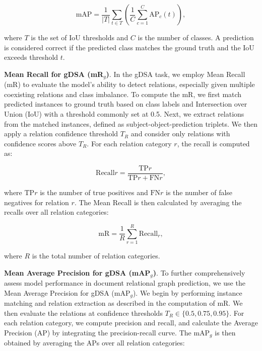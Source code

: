 \begin{equation} \text{mAP} = \frac{1}{|T|} \sum_{t \in T} \left( \frac{1}{C} \sum_{c=1}^{C} \text{AP}_{c}(t) \right), \end{equation}

where $T$ is the set of IoU thresholds and $C$ is the number of classes. A prediction is considered correct if the predicted class matches the ground truth and the IoU exceeds threshold $t$.

\noindent \textbf{Mean Recall for gDSA (mR$_g$)}. In the gDSA task, we employ Mean Recall (mR) to evaluate the model's ability to detect relations, especially given multiple coexisting relations and class imbalance. To compute the mR, we first match predicted instances to ground truth based on class labels and Intersection over Union (IoU) with a threshold commonly set at 0.5. Next, we extract relations from the matched instances, defined as subject-object-prediction triplets. We then apply a relation confidence threshold $T_{R}$ and consider only relations with confidence scores above $T_{R}$. For each relation category $r$, the recall is computed as:

\begin{equation} \text{Recall}{r} = \frac{\text{TP}{r}}{\text{TP}{r} + \text{FN}{r}}, \end{equation}

where $\text{TP}{r}$ is the number of true positives and $\text{FN}{r}$ is the number of false negatives for relation $r$. The Mean Recall is then calculated by averaging the recalls over all relation categories:

\begin{equation} \text{mR} = \frac{1}{R} \sum_{r=1}^{R} \text{Recall}_{r}, \end{equation}

where $R$ is the total number of relation categories.

\noindent \textbf{Mean Average Precision for gDSA (mAP$_g$)}. To further comprehensively assess model performance in document relational graph prediction, we use the Mean Average Precision for gDSA (mAP$_g$). We begin by performing instance matching and relation extraction as described in the computation of mR. We then evaluate the relations at confidence thresholds $ T_{R} \in \{0.5, 0.75, 0.95\} $. For each relation category, we compute precision and recall, and calculate the Average Precision (AP) by integrating the precision-recall curve. The  mAP$_g $ is then obtained by averaging the APs over all relation categories:

